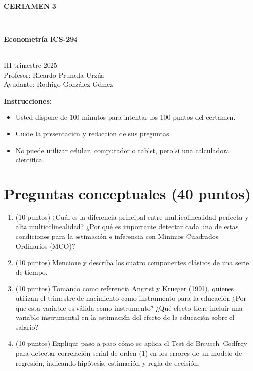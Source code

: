 \documentclass[10pt,a4paper]{article}
\begin{document}
\vspace{5cm}



\begin{center}
\begin{large}
\textbf{\\CERTAMEN 3}
\end{large}\\
\end{center}

\begin{center}
\begin{large}
\textbf{Econometría ICS-294}
\end{large}\\
\vspace{0.2cm}
III trimestre 2025\\
Profesor: Ricardo Pruneda Urzúa\\
Ayudante: Rodrigo González Gómez
\end{center}

\textbf{Instrucciones:} 

\begin{itemize}

    \item Usted dispone de 100 minutos  para intentar los 100 puntos del certamen.
    \item Cuide la presentación y redacción de sus preguntas.
    \item No puede utilizar celular, computador o tablet, pero sí una calculadora científica.
     
\end{itemize}

\section{Preguntas conceptuales (40 puntos)}

\begin{enumerate}

\item (10 puntos) ¿Cuál es la diferencia principal entre multicolinealidad perfecta y alta multicolinealidad?
¿Por qué es importante detectar cada una de estas condiciones para la estimación e inferencia con Mínimos Cuadrados Ordinarios (MCO)?


\item (10 puntos) Mencione y describa los cuatro componentes clásicos de una serie de tiempo.


\item (10 puntos) Tomando como referencia Angrist y Krueger (1991), quienes utilizan el trimestre de nacimiento como instrumento para la educación ¿Por qué esta variable es válida como instrumento? ¿Qué efecto tiene incluir una variable instrumental en la estimación del efecto de la educación sobre el salario?


\item (10 puntos) Explique paso a paso cómo se aplica el Test de Breusch--Godfrey para detectar correlación serial de orden (1) en los errores de un modelo de regresión, indicando hipótesis, estimación y regla de decisión.


\end{enumerate}
\end{document}

